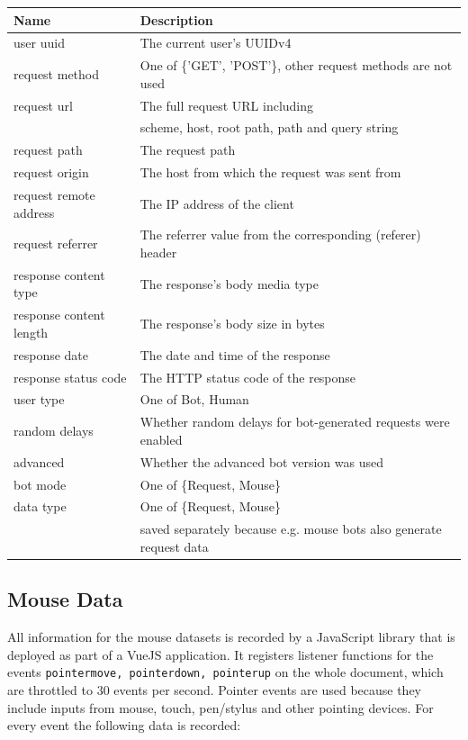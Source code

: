 \documentclass[
    fontsize=12pt,
    headings=small,
    parskip=half,           %
    bibliography=totoc,
    numbers=noenddot,       %
    open=any,               %
    final,                   %
    table
]{scrreprt}
\begin{document}
\begin{table}[H]
\begin{center}
\begin{tabular}{ll}
\toprule
Name & Description \\
\midrule
user uuid & The current user's UUIDv4 \\
request method & One of \{'GET', 'POST'\}, other request methods are not used \\
request url & The full request URL including \\ & scheme, host, root path, path and query string \\
request path & The request path \\
request origin & The host from which the request was sent from \\
request remote address & The IP address of the client \\
request referrer & The referrer value from the corresponding (referer) header\\
response content type & The response's body media type \\
response content length & The response's body size in bytes \\
response date & The date and time of the response \\
response status code & The HTTP status code of the response \\
user type & One of {Bot, Human} \\
random delays & Whether random delays for bot-generated requests were enabled \\
advanced & Whether the advanced bot version was used \\
bot mode & One of \{Request, Mouse\} \\
data type & One of \{Request, Mouse\} \\ & saved separately because e.g. mouse bots also generate request data \\
\bottomrule

\end{tabular}
\end{center}
\end{table}

\subsection{Mouse Data}

All information for the mouse datasets is recorded by a JavaScript library that is deployed as part of a VueJS application. It registers listener functions for the events \lstinline{pointermove, pointerdown, pointerup} on the whole document, which are throttled to $30$ events per second. Pointer events are used because they include inputs from mouse, touch, pen/stylus and other pointing devices. For every event the following data is recorded:
\end{document}
